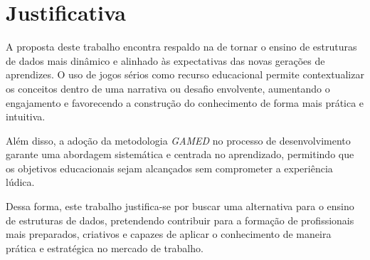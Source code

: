\section{Justificativa}

A proposta deste trabalho encontra respaldo na  de tornar o ensino de estruturas de dados mais dinâmico e alinhado às expectativas das novas gerações de aprendizes. O uso de jogos sérios como recurso educacional permite contextualizar os conceitos dentro de uma narrativa ou desafio envolvente, aumentando o engajamento e favorecendo a construção do conhecimento de forma mais prática e intuitiva. \cite{mouaheb2012serious}

Além disso, a adoção da metodologia \emph{GAMED} no processo de desenvolvimento garante uma abordagem sistemática e centrada no aprendizado, permitindo que os objetivos educacionais sejam alcançados sem comprometer a experiência lúdica.

Dessa forma, este trabalho justifica-se por buscar uma alternativa para o ensino de estruturas de dados, pretendendo contribuir para a formação de profissionais mais preparados, criativos e capazes de aplicar o conhecimento de maneira prática e estratégica no mercado de trabalho.
